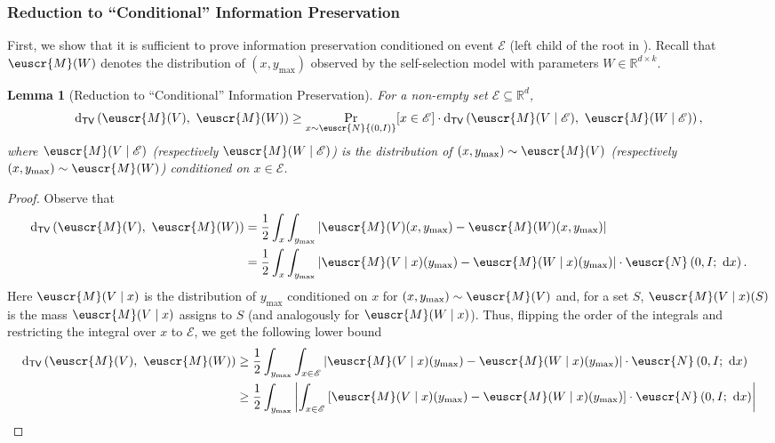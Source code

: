 \documentclass[11pt,letterpaper]{article}
\theoremstyle{plain}
\newtheorem{lemma}[theorem]{Lemma}
\theoremstyle{definition}
\theoremstyle{remark}
\def\abs#1{\left| #1 \right|}
\newcommand{\inparen}[1]{\ensuremath{\left(#1\right)}}
\newcommand{\insquare}[1]{\ensuremath{\left[#1\right]}}
\newcommand{\R}{\mathbb{R}}
\newcommand{\evE}{\ensuremath{\mathscr{E}}}
\newcommand{\tv}[2]{\operatorname{d}_{\mathsf{TV}}{\inparen{#1,#2}}}
\newcommand{\customcal}[1]{\euscr{#1}}
\newcommand{\cM}{\customcal{M}}
\newcommand{\cN}{\customcal{N}}
\renewcommand{\d}{{\rm d}}
\newcommand{\normal}[2]{\cN{\inparen{#1,#2}}}
\newcommand{\normalMass}[3]{\cN\inparen{#1, #2; #3}}
\newcommand{\ymax}{y_{\max}}
\begin{document}
{{{        \subsubsection{Reduction to ``Conditional'' Information Preservation}
        First, we show that it is sufficient to prove information preservation conditioned on event $\evE$ {(left child of the root in )}.
        {Recall that $\cM(W)$ denotes the distribution of $(x,\ymax)$ observed by the self-selection model with parameters $W \in \R^{d \times k}$.}
        \begin{lemma}[Reduction to ``Conditional'' Information Preservation]
            \label{lem:SS:IP:reductionToConditionalIP}
            For a non-empty set $\evE\subseteq \R^d$, 
            \[
                \tv{\cM(V)}{~\cM(W)} 
                \geq 
                \Pr_{x\sim \normal{0}{I}}[x\in\evE]\cdot \tv{\cM(V\mid \evE)}{~\cM(W\mid \evE)}\,,
            \]
            where $\cM(V\mid \evE)$ (respectively $\cM(W\mid \evE)$) is the distribution of $(x,\ymax)\sim \cM(V)$ (respectively $(x,\ymax)\sim \cM(W)$) conditioned on $x\in \evE$. 
        \end{lemma}
        \begin{proof}
            Observe that 
            {
            \begin{align*}
                \tv{\cM(V)}{~\cM(W)} 
                &= {\frac12 \int_x\int_{\ymax} \abs{\cM(V)(x, \ymax) - \cM(W)(x, \ymax)}} \\
                &= {\frac12 \int_x \int_{\ymax} \abs{\cM(V\mid x)(\ymax) - \cM(W\mid x)(\ymax)}\cdot \normalMass{0}{I}{~\d x}}\,. %
            \end{align*}
            }
            Here $\cM(V\mid x)$ is the distribution of $\ymax$ conditioned on $x$ for $(x,\ymax)\sim\cM(V)$ and, for a set $S$, $\cM(V\mid x)(S)$ is the mass $\cM(V\mid x)$ assigns to $S$ (and analogously for $\cM(W\mid x)$).
            Thus, flipping the order of the integrals and restricting the integral over $x$ to $\evE$, we get the following lower bound
            \begin{align*}
                \tv{\cM(V)}{~\cM(W)} 
                &\geq {\frac12 \int_{\ymax} \int_{x\in \evE} \abs{\cM(V\mid x)(\ymax) - \cM(W\mid x)(\ymax)}\cdot \normalMass{0}{I}{~\d x}} \\
                &\geq \frac12 \int_{\ymax} \abs{\int_{x\in \evE} \insquare{\cM(V\mid x)(\ymax) - \cM(W\mid x)(\ymax)}\cdot \normalMass{0}{I}{~\d x}} \\

\end{align*}
\end{proof}}}}
\end{document}
